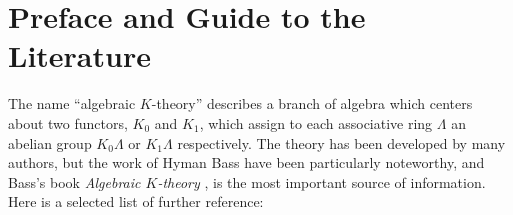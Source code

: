 \section{Preface and Guide to the Literature}

The name ``algebraic $K $-theory'' describes a branch of algebra which centers about two functors, $K_{0} $ and $K_{1} $, which assign to each associative ring $\Lambda $ an abelian group $K_{0}\Lambda $ or $K_{1}\Lambda $ respectively. The theory has been developed by many authors, but the work of Hyman Bass have been particularly noteworthy, and Bass's book \textit{Algebraic $K $-theory} \textcite{Bass1968AlgebraicK}, is the most important source of information. Here is a selected list of further reference:
\nocite{*}
\printbibliography
